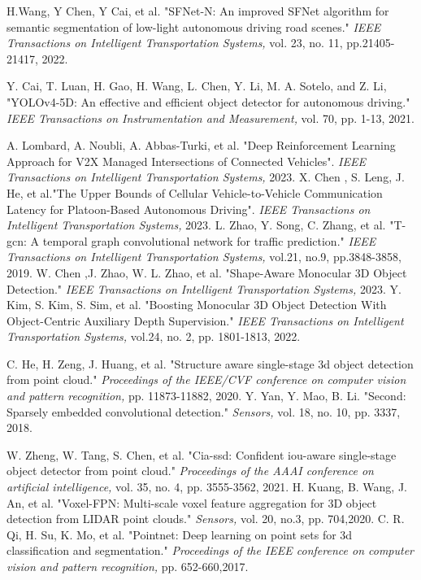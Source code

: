 \documentclass[lettersize,journal]{IEEEtran}
\begin{document}
\begin{thebibliography}{1}

H.Wang, Y Chen, Y Cai, et al. "SFNet-N: An improved SFNet algorithm for semantic segmentation of low-light autonomous driving road scenes." {\it{IEEE Transactions on Intelligent Transportation Systems,}} vol. 23, no. 11, pp.21405-21417, 2022.

Y. Cai, T. Luan, H. Gao, H. Wang, L. Chen, Y. Li, M. A. Sotelo, and Z. Li, "YOLOv4-5D: An effective and efficient object detector for autonomous driving."{\it{ IEEE Transactions on Instrumentation and Measurement,}} vol. 70, pp. 1-13, 2021. 

A. Lombard, A. Noubli, A. Abbas-Turki, et al. "Deep Reinforcement Learning Approach for V2X Managed Intersections of Connected Vehicles". {\it{IEEE Transactions on Intelligent Transportation Systems,}} 2023.
X. Chen , S. Leng, J. He, et al."The Upper Bounds of Cellular Vehicle-to-Vehicle Communication Latency for Platoon-Based Autonomous Driving". {\it{IEEE Transactions on Intelligent Transportation Systems,}} 2023.
L. Zhao, Y. Song, C. Zhang, et al. "T-gcn: A temporal graph convolutional network for traffic prediction." {\it{IEEE Transactions on Intelligent Transportation Systems,}} vol.21, no.9, pp.3848-3858, 2019.
W. Chen ,J. Zhao, W. L. Zhao, et al. "Shape-Aware Monocular 3D Object Detection." {\it{IEEE Transactions on Intelligent Transportation Systems,}} 2023.
Y. Kim, S. Kim, S. Sim, et al. "Boosting Monocular 3D Object Detection With Object-Centric Auxiliary Depth Supervision." {\it{IEEE Transactions on Intelligent Transportation Systems,}} vol.24, no. 2, pp. 1801-1813, 2022.

C. He, H. Zeng, J. Huang, et al. "Structure aware single-stage 3d object detection from point cloud." {\it{Proceedings of the IEEE/CVF conference on computer vision and pattern recognition,}} pp. 11873-11882, 2020.
Y. Yan, Y. Mao, B. Li.  "Second: Sparsely embedded convolutional detection." {\it{Sensors,}} vol. 18, no. 10, pp. 3337, 2018.

W. Zheng, W. Tang, S. Chen, et al. "Cia-ssd: Confident iou-aware single-stage object detector from point cloud." {\it{Proceedings of the AAAI conference on artificial intelligence,}} vol. 35, no. 4, pp. 3555-3562, 2021.
H. Kuang, B. Wang, J. An, et al. "Voxel-FPN: Multi-scale voxel feature aggregation for 3D object detection from LIDAR point clouds."{\it{ Sensors,}} vol. 20, no.3, pp. 704,2020.
C. R. Qi, H. Su, K. Mo, et al. "Pointnet: Deep learning on point sets for 3d classification and segmentation." {\it{Proceedings of the IEEE conference on computer vision and pattern recognition,}} pp. 652-660,2017.


\end{thebibliography}
\end{document}
